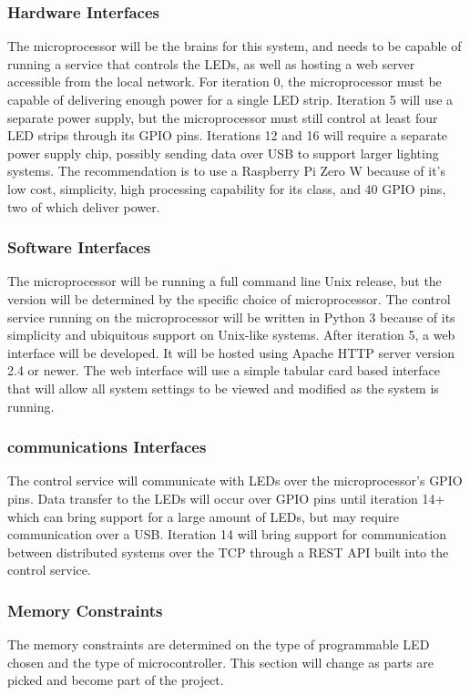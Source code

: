 \documentclass[onecolumn, draftclsnofoot,10pt, compsoc]{IEEEtran}
\begin{document}
			\subsubsection*{Hardware Interfaces}
				The microprocessor will be the brains for this system, and needs to be capable of running a service that controls the LEDs, as well as hosting a web server accessible from the local network.
				For iteration 0, the microprocessor must be capable of delivering enough power for a single LED strip. Iteration 5 will use a separate power supply, but the microprocessor must still control
				at least four LED strips through its GPIO pins. Iterations 12 and 16 will require a separate power supply chip, possibly sending data over USB to support larger lighting systems.
				The recommendation is to use a Raspberry Pi Zero W because of it’s low cost, simplicity, high processing capability for its class, and 40 GPIO pins, two of which deliver power.
			\subsubsection*{Software Interfaces}
				The microprocessor will be running a full command line Unix release, but the version will be determined by the specific choice of microprocessor.
				The control service running on the microprocessor will be written in Python 3 because of its simplicity and ubiquitous support on Unix-like systems.
				After iteration 5, a web interface will be developed. It will be hosted using Apache HTTP server version 2.4 or newer. The web interface will use a simple tabular card based interface
				that will allow all system settings to be viewed and modified as the system is running.

			\subsubsection*{communications Interfaces}
				The control service will communicate with LEDs over the microprocessor's GPIO pins. Data transfer to the LEDs will occur over GPIO pins until iteration 14+ which can bring support for a
				large amount of LEDs, but may require communication over a USB.
				Iteration 14 will bring support for communication between distributed systems over the TCP through a REST API built into the control service.
			\subsubsection*{Memory Constraints}
				The memory constraints are determined on the type of programmable LED chosen and the type of microcontroller. This section will change as parts are picked and become part of the project.
\end{document}
